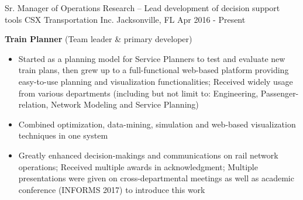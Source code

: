 

\begin{cventries}

\cventry
{Sr. Manager of Operations Research \tiny{-- Lead development of decision support tools}}     %
{CSX Transportation Inc.}                %
{Jacksonville, FL}                       %
{Apr 2016 - Present}                     %
{
    \begin{cvitems}
        \item {
\textbf{Train Planner} {(Team leader \& primary developer) }   
\begin{itemize}
    \item  Started as a planning model for Service Planners to test and evaluate new train plans, then grew up to a full-functional web-based platform providing easy-to-use planning and visualization functionalities; Received widely usage from various departments (including but not limit to: Engineering, Passenger-relation, Network Modeling and Service Planning)
    \item  Combined optimization, data-mining, simulation and web-based visualization techniques in one system
    \item  Greatly enhanced decision-makings and communications on rail network operations; Received multiple awards in acknowledgment; Multiple presentations were given  on cross-departmental meetings as well as academic conference (INFORMS 2017) to introduce this work
\end{itemize}           
        }
    \end{cvitems}%
}


\end{cventries}
